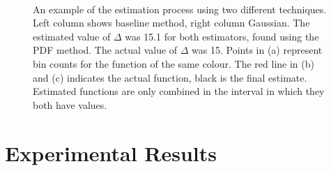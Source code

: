 \documentclass[a4paper,11pt]{article}
\begin{document}
\begin{figure}[]
{   }\\

   \caption{An example of the estimation process using two different
   techniques. Left column shows baseline method, right column Gaussian. The
   estimated value of $\Delta$ was 15.1 for both estimators, found using the PDF
   method. The actual value of $\Delta$ was 15. Points in (a) represent bin
   counts for the function of the same colour. The red line in (b) and (c)
   indicates the actual function, black is the final estimate. Estimated
   functions are only combined in the interval in which they both have values.}

   \label{fig:finest}
   \end{figure}
\section{Experimental Results}
\label{sec-5}
\end{document}
